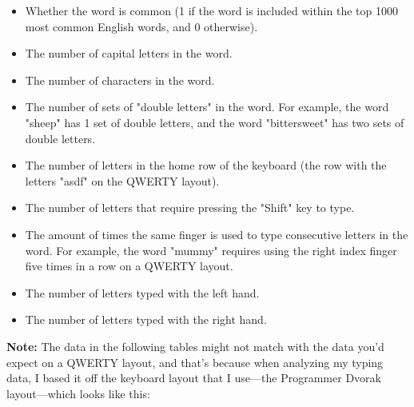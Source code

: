 \documentclass[12pt, demo]{article}
\begin{document}
\begin{itemize}
	\item Whether the word is common (1 if the word is included within the top 1000 most common English words, and 0 otherwise).
	\item The number of capital letters in the word.
	\item The number of characters in the word.
	\item The number of sets of "double letters" in the word. For example, the word "sheep" has 1 set of double letters, and the word "bittersweet" has two sets of double letters.
	\item The number of letters in the home row of the keyboard (the row with the letters "asdf" on the QWERTY layout).
	\item The number of letters that require pressing the "Shift" key to type.
	\item The amount of times the same finger is used to type consecutive letters in the word. For example, the word "mummy" requires using the right index finger five times in a row on a QWERTY layout.
	\item The number of letters typed with the left hand.
	\item The number of letters typed with the right hand.
\end{itemize}

\textbf{Note:} The data in the following tables might not match with the data you'd expect on a QWERTY layout, and that's because when analyzing my typing data, I based it off the keyboard layout that I use—the Programmer Dvorak layout—which looks like this:
\end{document}
